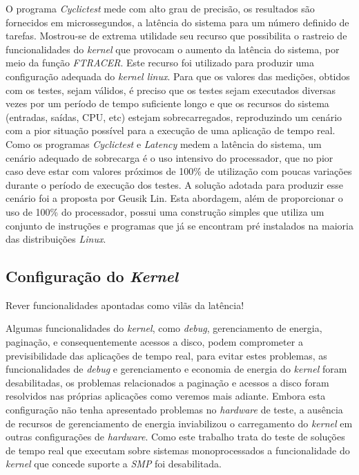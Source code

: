 O programa \textit{Cyclictest} mede com alto grau de precisão, os resultados são fornecidos em microssegundos, a latência do sistema para um número definido de tarefas. Mostrou-se de extrema utilidade seu recurso que possibilita o rastreio de funcionalidades do \textit{kernel} que provocam o aumento da latência do sistema, por meio da função \textit{FTRACER}. Este recurso foi utilizado para produzir uma configuração adequada do \textit{kernel linux}.
Para que os valores das medições, obtidos com os testes, sejam válidos, é preciso que os testes sejam executados diversas vezes por um período de tempo suficiente longo e que os recursos do sistema (entradas, saídas, CPU, etc) estejam sobrecarregados, reproduzindo um cenário com a pior situação possível para a execução de uma aplicação de tempo real. Como os programas \textit{Cyclictest} e \textit{Latency} medem a latência do sistema, um cenário adequado de sobrecarga é o uso intensivo do processador, que no pior caso deve estar com valores próximos de 100\% de utilização  com poucas variações durante o período de execução dos testes. A solução adotada para produzir esse cenário foi a proposta por Geusik Lin. Esta abordagem, além de proporcionar o uso de 100\% do processador, possui uma construção simples que utiliza um conjunto de instruções e programas que já se encontram pré instalados na maioria das distribuições \textit{Linux}.

\subsection{Configuração do \textit{Kernel}}  
Rever funcionalidades apontadas como vilãs da latência!

Algumas funcionalidades do \textit{kernel}, como \textit{debug}, gerenciamento de energia, paginação, e consequentemente acessos a disco, podem comprometer a previsibilidade das aplicações de tempo real, para evitar estes problemas, as funcionalidades de \textit{debug} e gerenciamento e economia de energia do \textit{kernel} foram desabilitadas, os problemas relacionados a paginação e acessos a disco foram resolvidos nas próprias aplicações como veremos mais adiante. Embora esta configuração não tenha apresentado problemas no \textit{hardware} de teste, a ausência de recursos de gerenciamento de energia inviabilizou o carregamento do \textit{kernel} em outras configurações de \textit{hardware}. Como este trabalho trata do teste de soluções de tempo real que executam sobre sistemas monoprocessados a funcionalidade do \textit{kernel} que concede suporte a \textit{SMP} foi desabilitada.

